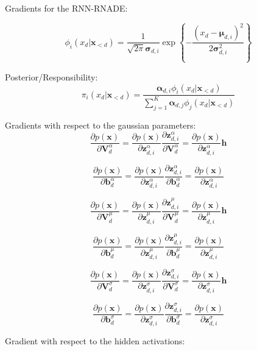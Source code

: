 \documentclass{article} %
\begin{document}
Gradients for the RNN-RNADE:

$$ \phi_i(x_d| \mathbf{x}_{<d}) = \frac{1}{\sqrt{2 \pi} \boldsymbol{\sigma}_{d,i}} \exp{\left\{-\frac{(x_d-\boldsymbol{\mu}_{d,i})^2}{2 \boldsymbol{\sigma}_{d,i}^2}\right\}}$$

Posterior/Responsibility:
$$ \pi_{i}(x_d|\mathbf{x}_{<d}) = \frac{\boldsymbol{\alpha}_{d,i} \phi_i(x_d| \mathbf{x}_{<d})}{\sum_{j=1}^K \boldsymbol{\alpha}_{d,j} \phi_j(x_d| \mathbf{x}_{<d})}$$

Gradients with respect to the gaussian parameters:
$$ \frac{\partial p(\mathbf{x})}{\partial \mathbf{V}_{d}^{\alpha}} = \frac{\partial p(\mathbf{x})}{\partial \mathbf{z}_{d,i}^{\alpha}} \frac{\partial \mathbf{z}_{d,i}^{\alpha}}{\partial \mathbf{V}_{d}^{\alpha}} = \frac{\partial p(\mathbf{x})}{\partial \mathbf{z}_{d,i}^{\alpha}} \mathbf{h}$$

$$ \frac{\partial p(\mathbf{x})}{\partial \mathbf{b}_{d}^{\alpha}} = \frac{\partial p(\mathbf{x})}{\partial \mathbf{z}_{d,i}^{\alpha}} \frac{\partial \mathbf{z}_{d,i}^{\alpha}}{\partial \mathbf{b}_{d}^{\alpha}} = \frac{\partial p(\mathbf{x})}{\partial \mathbf{z}_{d,i}^{\alpha}}$$



$$ \frac{\partial p(\mathbf{x})}{\partial \mathbf{V}_{d}^{\mu}} = \frac{\partial p(\mathbf{x})}{\partial \mathbf{z}_{d,i}^{\mu}} \frac{\partial \mathbf{z}_{d,i}^{\mu}}{\partial \mathbf{V}_{d}^{\mu}} = \frac{\partial p(\mathbf{x})}{\partial \mathbf{z}_{d,i}^{\mu}} \mathbf{h}$$

$$ \frac{\partial p(\mathbf{x})}{\partial \mathbf{b}_{d}^{\mu}} = \frac{\partial p(\mathbf{x})}{\partial \mathbf{z}_{d,i}^{\mu}} \frac{\partial \mathbf{z}_{d,i}^{\mu}}{\partial \mathbf{b}_{d}^{\mu}} = \frac{\partial p(\mathbf{x})}{\partial \mathbf{z}_{d,i}^{\mu}}$$

$$ \frac{\partial p(\mathbf{x})}{\partial \mathbf{V}_{d}^{\sigma}} = \frac{\partial p(\mathbf{x})}{\partial \mathbf{z}_{d,i}^{\sigma}} \frac{\partial \mathbf{z}_{d,i}^{\sigma}}{\partial \mathbf{V}_{d}^{\sigma}} = \frac{\partial p(\mathbf{x})}{\partial \mathbf{z}_{d,i}^{\sigma}} \mathbf{h}$$

$$ \frac{\partial p(\mathbf{x})}{\partial \mathbf{b}_{d}^{\sigma}} = \frac{\partial p(\mathbf{x})}{\partial \mathbf{z}_{d,i}^{\sigma}} \frac{\partial \mathbf{z}_{d,i}^{\sigma}}{\partial \mathbf{b}_{d}^{\sigma}} = \frac{\partial p(\mathbf{x})}{\partial \mathbf{z}_{d,i}^{\sigma}}$$

Gradient with respect to the hidden activations:
\end{document}
